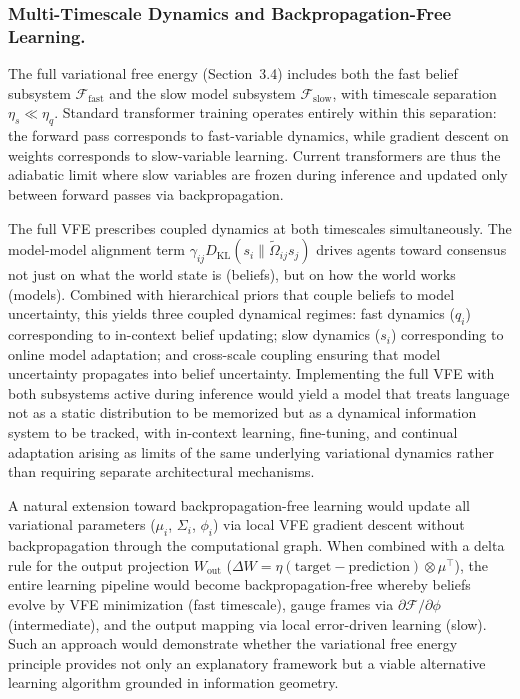\documentclass[twoside,11pt]{article}
\begin{document}
\subsubsection{Multi-Timescale Dynamics and Backpropagation-Free Learning.}

The full variational free energy (Section~3.4) includes both the fast belief subsystem $\mathcal{F}_{\text{fast}}$ and the slow model subsystem $\mathcal{F}_{\text{slow}}$, with timescale separation $\eta_s \ll \eta_q$. Standard transformer training operates entirely within this separation: the forward pass corresponds to fast-variable dynamics, while gradient descent on weights corresponds to slow-variable learning. Current transformers are thus the adiabatic limit where slow variables are frozen during inference and updated only between forward passes via backpropagation.

The full VFE prescribes coupled dynamics at both timescales simultaneously. The model-model alignment term $\gamma_{ij} D_{\mathrm{KL}}(s_i \| \tilde{\Omega}_{ij} s_j)$ drives agents toward consensus not just on what the world state is (beliefs), but on how the world works (models). Combined with hierarchical priors that couple beliefs to model uncertainty, this yields three coupled dynamical regimes: fast dynamics ($q_i$) corresponding to in-context belief updating; slow dynamics ($s_i$) corresponding to online model adaptation; and cross-scale coupling ensuring that model uncertainty propagates into belief uncertainty. Implementing the full VFE with both subsystems active during inference would yield a model that treats language not as a static distribution to be memorized but as a dynamical information system to be tracked, with in-context learning, fine-tuning, and continual adaptation arising as limits of the same underlying variational dynamics rather than requiring separate architectural mechanisms.

A natural extension toward backpropagation-free learning would update all variational parameters ($\mu_i$, $\Sigma_i$, $\phi_i$) via local VFE gradient descent without backpropagation through the computational graph. When combined with a delta rule for the output projection $W_{\text{out}}$ ($\Delta W = \eta(\text{target} - \text{prediction}) \otimes \mu^\top$), the entire learning pipeline would become backpropagation-free whereby beliefs evolve by VFE minimization (fast timescale), gauge frames via $\partial \mathcal{F}/\partial \phi$ (intermediate), and the output mapping via local error-driven learning (slow). Such an approach would demonstrate whether the variational free energy principle provides not only an explanatory framework but a viable alternative learning algorithm grounded in information geometry.
\end{document}
